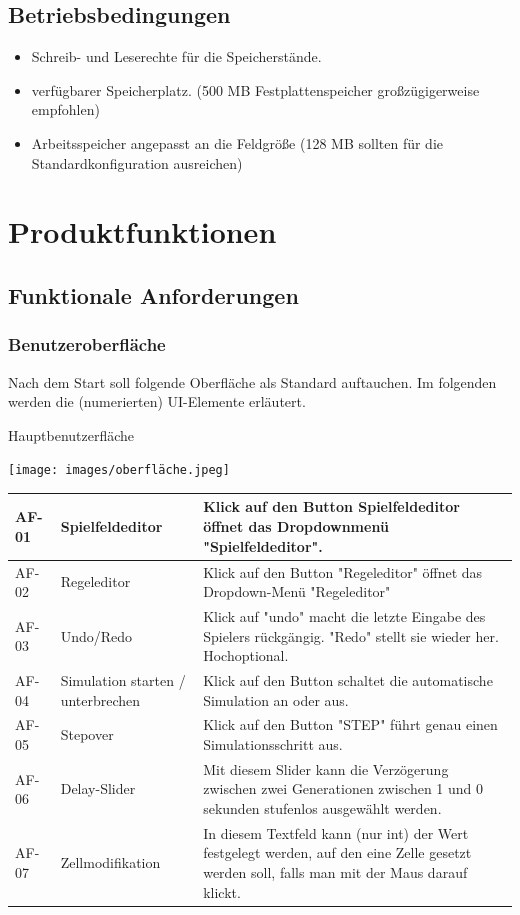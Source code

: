 \documentclass[11pt,a4paper]{article}
\begin{document}
\subsection{Betriebsbedingungen}


\begin{itemize}
    \item Schreib- und Leserechte für die Speicherstände.
    \item verfügbarer Speicherplatz. (500 MB Festplattenspeicher großzügigerweise empfohlen)
    \item Arbeitsspeicher angepasst an die Feldgröße (128 MB sollten für die Standardkonfiguration ausreichen)
\end{itemize}

\pagebreak



\section{Produktfunktionen}
\subsection{Funktionale Anforderungen}
\subsubsection{Benutzeroberfläche}
Nach dem Start soll folgende Oberfläche als Standard auftauchen. Im folgenden werden die (numerierten) UI-Elemente erläutert.
\par
Hauptbenutzerfläche
\par
\texttt{[image: images/oberfläche.jpeg]}

\begin{longtable}[m]{|m{2cm}|m{4cm}|m{9cm}|}
\hline
 AF-01 & Spielfeldeditor & Klick auf den Button Spielfeldeditor öffnet das Dropdownmenü "Spielfeldeditor".   \\
 \hline
AF-02 & Regeleditor & Klick auf den Button "Regeleditor" öffnet das Dropdown-Menü "Regeleditor" \\
 \hline
AF-03& Undo/Redo& Klick auf "undo" macht die letzte Eingabe des Spielers rückgängig. "Redo" stellt sie wieder her. Hochoptional. \\
 \hline
 AF-04 & Simulation starten / unterbrechen & Klick auf den Button schaltet die automatische Simulation an oder aus. \\
 \hline
 AF-05& Stepover & Klick auf den Button "STEP" führt genau einen Simulationsschritt aus.  \\

\hline
 AF-06 & Delay-Slider & Mit diesem Slider kann die Verzögerung zwischen zwei Generationen zwischen 1 und 0 sekunden stufenlos ausgewählt werden. \\
 \hline
 AF-07 & Zellmodifikation & In diesem Textfeld kann (nur int) der Wert festgelegt werden, auf den eine Zelle gesetzt werden soll, falls man mit der Maus darauf klickt.  \\
\hline
\end{longtable}
\end{document}
